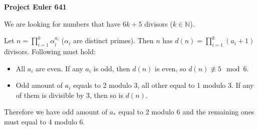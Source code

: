 \documentclass[a4paper,12pt]{article}
\begin{document}
\setlength\parindent{0pt}
\textbf{Project Euler 641}
\vspace{5ex}

We are looking for numbers that have \(6k + 5\) divisors (\(k \in \mathbb{N}\)).

Let \(n = \prod_{i = 1}^k \alpha_i^{a_i}\) (\(\alpha_i\) are distinct primes). Then \(n\) has \(d(n) = \prod_{i = 1}^k (a_i + 1)\) divisors. Following must hold:

\begin{itemize}
\item All \(a_i\) are even. If any \(a_i\) is odd, then \(d(n)\) is even, so \(d(n) \not\equiv 5 \mod 6\).
\item Odd amount of \(a_i\) equals to 2 modulo 3, all other equal to 1 modulo 3. If any of them is divisible by 3, then so is \(d(n)\).
\end{itemize}

Therefore we have odd amount of \(a_*\) equal to 2 modulo 6 and the remaining ones must equal to 4 modulo 6.
\end{document}
